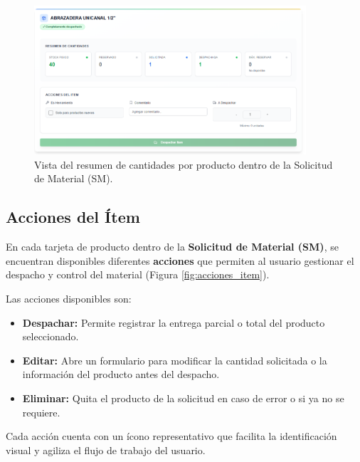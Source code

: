 \begin{figure}[H]
    \centering
    \includegraphics[width=0.9\textwidth]{imgs/Almacen_General/Procesamiento_SM/procesamieno_sm_resumen_cantidades.png}
    \caption{Vista del resumen de cantidades por producto dentro de la Solicitud de Material (SM).}
    \label{fig:resumen_cantidades}
\end{figure}


\subsection{Acciones del Ítem}

\vspace{-0.5em} %

En cada tarjeta de producto dentro de la \textbf{Solicitud de Material (SM)}, se encuentran disponibles diferentes \textbf{acciones} que permiten al usuario gestionar el despacho y control del material (Figura \ref{fig:acciones_item}).

Las acciones disponibles son:

\begin{itemize}
    \item \textbf{Despachar:} Permite registrar la entrega parcial o total del producto seleccionado.
    \item \textbf{Editar:} Abre un formulario para modificar la cantidad solicitada o la información del producto antes del despacho.
    \item \textbf{Eliminar:} Quita el producto de la solicitud en caso de error o si ya no se requiere.
\end{itemize}

Cada acción cuenta con un ícono representativo que facilita la identificación visual y agiliza el flujo de trabajo del usuario.

